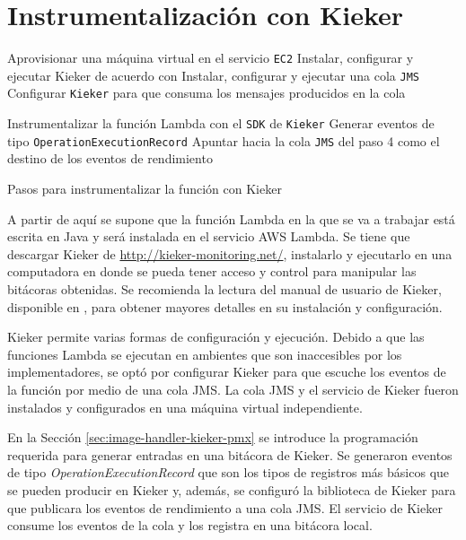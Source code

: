 \section{Instrumentalización con Kieker}

\begin{singlespace}
\begin{algorithm}[H]
\SetAlgoLined
Aprovisionar una máquina virtual en el servicio \texttt{EC2}\;
Instalar, configurar y ejecutar Kieker de acuerdo con \cite{kieker-user-guide}\;
Instalar, configurar y ejecutar una cola \texttt{JMS}\;
Configurar \texttt{Kieker} para que consuma los mensajes producidos en la cola\;

Instrumentalizar la función Lambda con el \texttt{SDK} de \texttt{Kieker}\;
Generar eventos de tipo \texttt{OperationExecutionRecord}\;
Apuntar hacia la cola \texttt{JMS} del paso 4 como el destino de los eventos de rendimiento\;

 \caption{Pasos para instrumentalizar la función con Kieker}
\end{algorithm}
\end{singlespace}

A partir de aquí se supone que la función Lambda en la que se va a trabajar está escrita en Java y será instalada en el servicio AWS Lambda. Se tiene que descargar Kieker de \url{http://kieker-monitoring.net/}, instalarlo y ejecutarlo en una computadora en donde se pueda tener acceso y control para manipular las bitácoras obtenidas. Se recomienda la lectura del manual de usuario de Kieker, disponible en \cite{kieker-user-guide}, para obtener mayores detalles en su instalación y configuración.

Kieker permite varias formas de configuración y ejecución. Debido a que las funciones Lambda se ejecutan en ambientes que son inaccesibles por los implementadores, se optó por configurar Kieker para que escuche los eventos de la función por medio de una cola JMS. La cola JMS y el servicio de Kieker fueron instalados y configurados en una máquina virtual independiente.

En la Sección \ref{sec:image-handler-kieker-pmx} se introduce la programación requerida para generar entradas en una bitácora de Kieker. Se generaron eventos de tipo \emph{OperationExecutionRecord} que son los tipos de registros más básicos que se pueden producir en Kieker y, además, se configuró la biblioteca de Kieker para que publicara los eventos de rendimiento a una cola JMS. El servicio de Kieker consume los eventos de la cola y los registra en una bitácora local.

